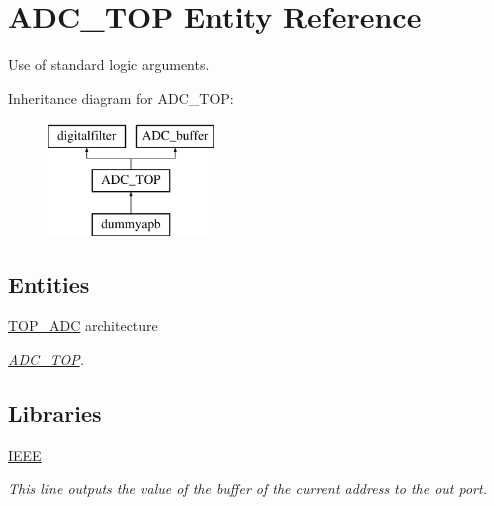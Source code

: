 \hypertarget{classADC__TOP}{\section{A\-D\-C\-\_\-\-T\-O\-P Entity Reference}
\label{classADC__TOP}
}


Use of standard logic arguments.  


Inheritance diagram for A\-D\-C\-\_\-\-T\-O\-P\-:\begin{figure}[H]
\begin{center}
\leavevmode
\includegraphics[height=3.000000cm]{classADC__TOP}
\end{center}
\end{figure}
\subsection*{Entities}
\begin{DoxyCompactItemize}
\item 
\hyperlink{classADC__TOP_1_1TOP__ADC}{T\-O\-P\-\_\-\-A\-D\-C} architecture
\begin{DoxyCompactList}\small\item\em \hyperlink{classADC__TOP}{A\-D\-C\-\_\-\-T\-O\-P}. \end{DoxyCompactList}\end{DoxyCompactItemize}
\subsection*{Libraries}
 \begin{DoxyCompactItemize}
\item 
\hypertarget{classADC__TOP_ae4f03c286607f3181e16b9aa12d0c6d4}{\hyperlink{classADC__TOP_ae4f03c286607f3181e16b9aa12d0c6d4}{I\-E\-E\-E} }\label{classADC__TOP_ae4f03c286607f3181e16b9aa12d0c6d4}

\begin{DoxyCompactList}\small\item\em This line outputs the value of the buffer of the current address to the out port. \end{DoxyCompactList}\end{DoxyCompactItemize}
